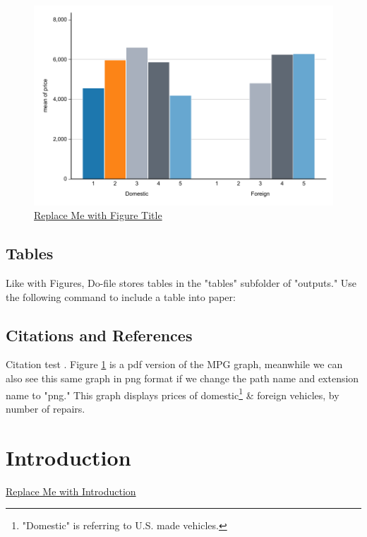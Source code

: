 \documentclass[12pt]{article}
\begin{document}
\begin{figure}[ht]
\centering
\caption{\underline{Replace Me with Figure Title}}
\label{fig:Replace_Me_with_Ref_Label}
\includegraphics[width=1\textwidth]{outputs/figures/pdf/project_name_figure_name.pdf}
\end{figure}

\subsection{Tables}

Like with Figures, Do-file stores tables in the "tables" subfolder of "outputs." Use the following command to include a table into paper:



\subsection{Citations and References}

Citation test \parencite{storer2023sweet}. Figure \ref{fig:Replace_Me_with_Ref_Label} is a pdf version of the MPG graph, meanwhile we can also see this same graph in png format if we change the path name and extension name to "png." This graph displays prices of domestic\footnote{"Domestic" is referring to U.S. made vehicles.\label{fnote:domestic}} 
\& foreign vehicles, by number of repairs.

\section{Introduction}

\underline{Replace Me with Introduction}


\printbibliography 
\end{document}
